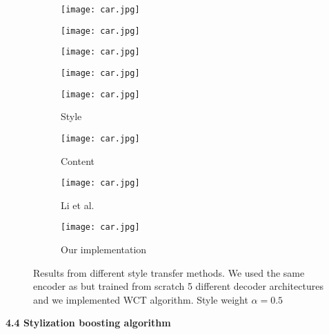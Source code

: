\begin{figure}[h!]
	\centering
	\begin{subfigure}[b]{0.225\linewidth}
		\texttt{[image: car.jpg]} %
	\end{subfigure}
	\begin{subfigure}[b]{0.225\linewidth}
		\texttt{[image: car.jpg]} %
	\end{subfigure}
	\begin{subfigure}[b]{0.225\linewidth}
		\texttt{[image: car.jpg]} %
	\end{subfigure}
	\begin{subfigure}[b]{0.225\linewidth}
		\texttt{[image: car.jpg]} %
	\end{subfigure}
	\centering
	\begin{subfigure}[b]{0.225\linewidth}
		\texttt{[image: car.jpg]} %
		\caption{Style}
	\end{subfigure}
	\begin{subfigure}[b]{0.225\linewidth}
		\texttt{[image: car.jpg]} %
		\caption{Content}
	\end{subfigure}
	\begin{subfigure}[b]{0.225\linewidth}
		\texttt{[image: car.jpg]} %
		\caption{Li et al. \cite{bib11}}
	\end{subfigure}
	\begin{subfigure}[b]{0.225\linewidth}
		\texttt{[image: car.jpg]} %
		\caption{Our implementation}
	\end{subfigure}
	\caption{Results from different style transfer methods. We used the same encoder as \cite{bib11} but trained from scratch 5 different decoder architectures and we implemented WCT algorithm. Style weight $\alpha=0.5$}
	\label{fig:style_transfer}
\end{figure}
\begin{flushleft}
	\textbf{4.4 Stylization boosting algorithm}\newline
\end{flushleft}
